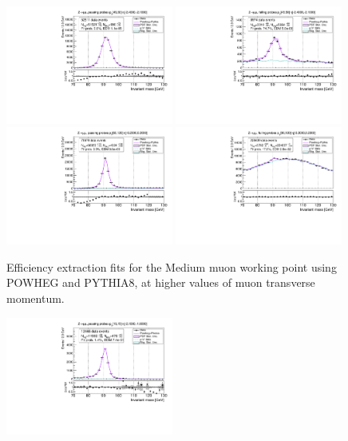 {\begin{figure}
\centering
\includegraphics[width=0.49\textwidth]{figures/Zmm_PowhegPythia_BkgLPi_pass_ptBin7_etaBin0.pdf}
\includegraphics[width=0.49\textwidth]{figures/Zmm_PowhegPythia_BkgLPi_fail_ptBin7_etaBin0.pdf}
\includegraphics[width=0.49\textwidth]{figures/Zmm_PowhegPythia_BkgLPi_pass_ptBin10_etaBin6.pdf}
\includegraphics[width=0.49\textwidth]{figures/Zmm_PowhegPythia_BkgLPi_fail_ptBin10_etaBin6.pdf}
\caption{Efficiency extraction fits for the Medium muon working point using POWHEG and PYTHIA8, at higher values of muon transverse momentum.}
\label{fig:ZmmAltSigFSRFits2}
\end{figure}
\begin{figure}
\centering
\includegraphics[width=0.49\textwidth]{figures/Zmm_PowhegPhotos_BkgLPi_pass_ptBin0_etaBin1.pdf}

\end{figure}}

